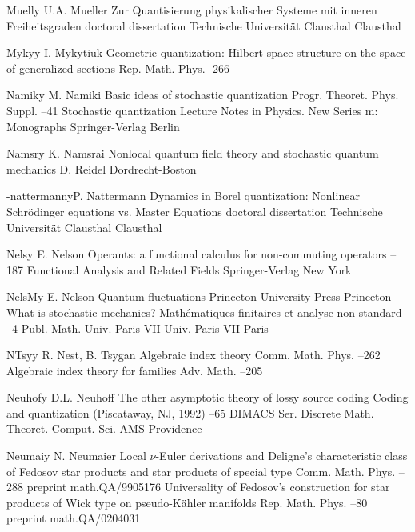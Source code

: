\documentclass[12pt]{amsart}
\numberwithin{equation}{section}
\theoremstyle{remark}
\newcommand{\by}{\mathbf y}
\begin{document}
\begin{thebibliography}{199}
 Muell\by{ U.A. Mueller \book Zur Quantisierung physikalischer Systeme
mit inneren Freiheitsgraden \bookinfo doctoral dissertation \publ Technische
Universit\"at Clausthal \publaddr Clausthal }

 Myky\by{ I. Mykytiuk \paper Geometric quantization: Hilbert space
structure on the space of generalized sections \jour Rep. Math. Phys. 
 -266}

 Namik\by{ M. Namiki \paper Basic ideas of stochastic quantization \jour
Progr. Theoret. Phys. Suppl.   --41 \moreref \book
Stochastic quantization \bookinfo Lecture Notes in Physics. New Series m:
Monographs  \publ Springer-Verlag \publaddr Berlin }

 Namsr\by{ K. Namsrai \book Nonlocal quantum field theory and stochastic
quantum mechanics \publ D. Reidel \publaddr Dordrecht-Boston }

 -nattermann\by{P. Nattermann \book Dynamics in Borel quantization:
Nonlinear Schr\"odinger equations vs. Master Equations \bookinfo doctoral
dissertation \publ Technische Universit\"at Clausthal \publaddr Clausthal
}

 Nels\by{ E. Nelson \paper Operants: a functional calculus for
non-commuting operators --187 \inbook Functional Analysis and Related
Fields  \publ Springer-Verlag \publaddr New York }

 NelsM\by{ E. Nelson \book Quantum fluctuations \publ Princeton University
Press \publaddr Princeton  \moreref \paper What is stochastic
mechanics? \inbook Math\'ematiques finitaires et analyse non standard --4 \bookinfo Publ. Math. Univ. Paris VII  \publ Univ. Paris VII
\publaddr Paris }

 NTsy\by{ R. Nest, B. Tsygan \paper Algebraic index theory \jour Comm.
Math. Phys.   --262 \moreref \paper Algebraic index
theory for families \jour Adv. Math.   --205}

 Neuhof\by{ D.L. Neuhoff \paper The other asymptotic theory of lossy
source coding \inbook Coding and quantization (Piscataway, NJ, 1992) --65 \bookinfo DIMACS Ser. Discrete Math. Theoret. Comput. Sci.  \publ
AMS \publaddr Providence }

 Neumai\by{ N. Neumaier \paper Local $\nu$-Euler derivations and Deligne's
characteristic class of Fedosov star products and star products of special type
\jour Comm. Math. Phys.   --288 \paperinfo preprint
math.QA/9905176 \moreref \paper Universality of Fedosov's construction for star
products of Wick type on pseudo-K\"ahler manifolds \jour Rep. Math. Phys.   --80 \paperinfo preprint math.QA/0204031}


\end{thebibliography}
\end{document}
